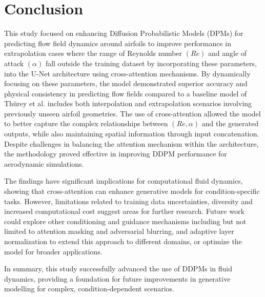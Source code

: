 \documentclass{CUP-JNL-DTM}%
\theoremstyle{definition}
\numberwithin{equation}{section}
\begin{document}
\section{Conclusion}
This study focused on enhancing Diffusion Probabilistic Models (DPMs) for predicting flow field dynamics around airfoils to improve performance in extrapolation cases where the range of Reynolds number $(Re)$ and angle of attack $(\alpha)$ fall outside the training dataset by incorporating these parameters, into the U-Net architecture using cross-attention mechanisms. By dynamically focusing on these parameters, the model demonstrated superior accuracy and physical consistency in predicting flow fields compared to a baseline model of Thürey et al.
includes both interpolation and extrapolation scenarios involving previously unseen airfoil geometries.
The use of cross-attention allowed the model to better capture the complex relationships between $(Re, \alpha)$ and the generated outputs, while also maintaining spatial information through input concatenation. Despite challenges in balancing the attention mechanism within the architecture, the methodology proved effective in improving DDPM performance for aerodynamic simulations.

The findings have significant implications for computational fluid dynamics, showing that cross-attention can enhance generative models for condition-specific tasks. However, limitations related to training data uncertainties, diversity and increased computational cost suggest areas for further research. Future work could explore other conditioning and guidance mechanisms including but not limited to attention masking and adversarial blurring, and adaptive layer normalization to extend this approach to different domains, or optimize the model for broader applications.

In summary, this study successfully advanced the use of DDPMs in fluid dynamics, providing a foundation for future improvements in generative modelling for complex, condition-dependent scenarios.
\end{document}
